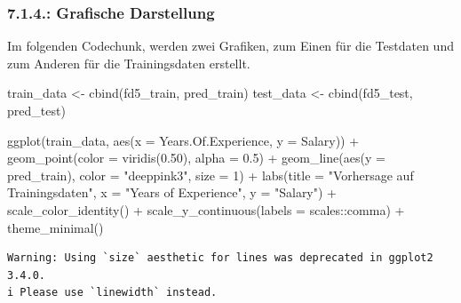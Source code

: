 \documentclass[
  letterpaper,
  DIV=11,
  numbers=noendperiod]{scrartcl}
\newenvironment{Shaded}{\begin{snugshade}}{\end{snugshade}}
\newcommand{\AttributeTok}[1]{\textcolor[rgb]{0.40,0.45,0.13}{#1}}
\newcommand{\DecValTok}[1]{\textcolor[rgb]{0.68,0.00,0.00}{#1}}
\newcommand{\FloatTok}[1]{\textcolor[rgb]{0.68,0.00,0.00}{#1}}
\newcommand{\FunctionTok}[1]{\textcolor[rgb]{0.28,0.35,0.67}{#1}}
\newcommand{\NormalTok}[1]{\textcolor[rgb]{0.00,0.23,0.31}{#1}}
\newcommand{\OtherTok}[1]{\textcolor[rgb]{0.00,0.23,0.31}{#1}}
\newcommand{\SpecialCharTok}[1]{\textcolor[rgb]{0.37,0.37,0.37}{#1}}
\newcommand{\StringTok}[1]{\textcolor[rgb]{0.13,0.47,0.30}{#1}}
\begin{document}
\hypertarget{grafische-darstellung}{%
\subsubsection{7.1.4.: Grafische
Darstellung}\label{grafische-darstellung}}

Im folgenden Codechunk, werden zwei Grafiken, zum Einen für die
Testdaten und zum Anderen für die Trainingsdaten erstellt.

\begin{Shaded}
\begin{Highlighting}[]
\NormalTok{train\_data }\OtherTok{\textless{}{-}} \FunctionTok{cbind}\NormalTok{(fd5\_train, pred\_train)}
\NormalTok{test\_data }\OtherTok{\textless{}{-}} \FunctionTok{cbind}\NormalTok{(fd5\_test, pred\_test)}

\FunctionTok{ggplot}\NormalTok{(train\_data, }\FunctionTok{aes}\NormalTok{(}\AttributeTok{x =}\NormalTok{ Years.Of.Experience, }\AttributeTok{y =}\NormalTok{ Salary)) }\SpecialCharTok{+}
  \FunctionTok{geom\_point}\NormalTok{(}\AttributeTok{color =} \FunctionTok{viridis}\NormalTok{(}\FloatTok{0.50}\NormalTok{), }\AttributeTok{alpha =} \FloatTok{0.5}\NormalTok{) }\SpecialCharTok{+}
  \FunctionTok{geom\_line}\NormalTok{(}\FunctionTok{aes}\NormalTok{(}\AttributeTok{y =}\NormalTok{ pred\_train), }\AttributeTok{color =} \StringTok{"deeppink3"}\NormalTok{, }\AttributeTok{size =} \DecValTok{1}\NormalTok{) }\SpecialCharTok{+}
  \FunctionTok{labs}\NormalTok{(}\AttributeTok{title =} \StringTok{"Vorhersage auf Trainingsdaten"}\NormalTok{,}
       \AttributeTok{x =} \StringTok{"Years of Experience"}\NormalTok{,}
       \AttributeTok{y =} \StringTok{"Salary"}\NormalTok{) }\SpecialCharTok{+}
  \FunctionTok{scale\_color\_identity}\NormalTok{() }\SpecialCharTok{+}
  \FunctionTok{scale\_y\_continuous}\NormalTok{(}\AttributeTok{labels =}\NormalTok{ scales}\SpecialCharTok{::}\NormalTok{comma) }\SpecialCharTok{+}
  \FunctionTok{theme\_minimal}\NormalTok{()}
\end{Highlighting}
\end{Shaded}

\begin{verbatim}
Warning: Using `size` aesthetic for lines was deprecated in ggplot2 3.4.0.
i Please use `linewidth` instead.
\end{verbatim}
\end{document}
